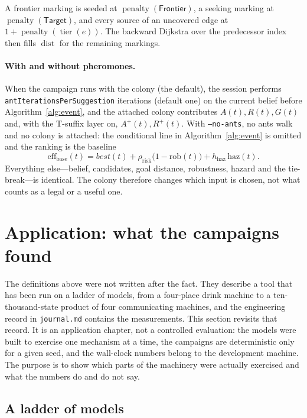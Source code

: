 \documentclass[11pt,a4paper]{article}
\newcommand{\dist}{\operatorname{dist}}
\newcommand{\tierpen}{\operatorname{penalty}}
\begin{document}
A frontier marking is seeded at $\tierpen(\mathsf{Frontier})$, a seeking
marking at $\tierpen(\mathsf{Target})$, and every source of an uncovered edge
at $1+\tierpen(\operatorname{tier}(e))$.  The backward Dijkstra over the
predecessor index then fills $\dist$ for the remaining markings.

\paragraph{With and without pheromones.}
When the campaign runs with the colony (the default), the session performs
\texttt{antIterationsPerSuggestion} iterations (default one) on the current
belief before Algorithm~\ref{alg:event}, and the attached colony contributes
$A(t),R(t),G(t)$ and, with the T-suffix layer on, $A^+(t),R^+(t)$.  With
\texttt{--no-ants}, no ants walk and no colony is attached: the conditional
line in Algorithm~\ref{alg:event} is omitted and the ranking is the baseline
\[
  \mathrm{eff}_{\mathrm{base}}(t)=\mathit{best}(t)
  +\rho_{\mathrm{risk}}\bigl(1-\mathrm{rob}(t)\bigr)
  +h_{\mathrm{haz}}\,\mathrm{haz}(t).
\]
Everything else---belief, candidates, goal distance, robustness, hazard and
the tie-break---is identical.  The colony therefore changes which input is
chosen, not what counts as a legal or a useful one.

\section{Application: what the campaigns found}\label{sec:application}

The definitions above were not written after the fact.  They describe a tool
that has been run on a ladder of models, from a four-place drink machine to a
ten-thousand-state product of four communicating machines, and the engineering
record in \texttt{journal.md} contains the measurements.  This section revisits
that record.  It is an application chapter, not a controlled evaluation: the
models were built to exercise one mechanism at a time, the campaigns are
deterministic only for a given seed, and the wall-clock numbers belong to the
development machine.  The purpose is to show which parts of the machinery were
actually exercised and what the numbers do and do not say.

\subsection{A ladder of models}
\end{document}
